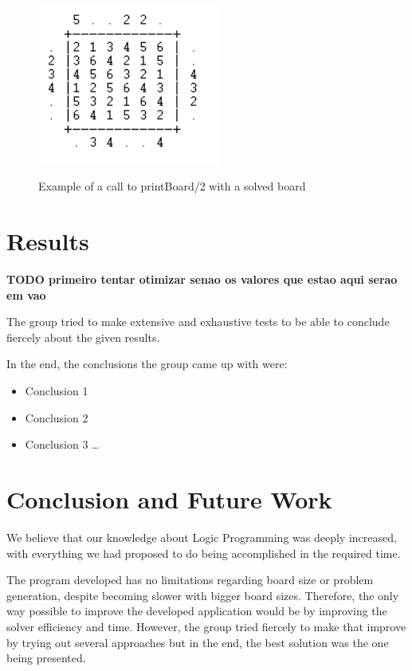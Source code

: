 \documentclass{llncs}
\begin{document}
\begin{figure}[h!]
\begin{center}
\includegraphics[height=6cm,width=6cm]{images/printBoard21.png}
\caption{Example of a call to printBoard/2 with a solved board}
\label{Figure 3}
\end{center}
\end{figure}

%
\section{Results}

\textbf{TODO primeiro tentar otimizar senao os valores que estao aqui serao em vao}

The group tried to make extensive and exhaustive tests to be able to conclude fiercely about the given results.

In the end, the conclusions the group came up with were:
\begin{itemize}
	\item Conclusion 1
	\item Conclusion 2
	\item Conclusion 3 \dots
\end{itemize}

%
\section{Conclusion and Future Work}

We believe that our knowledge about Logic Programming was deeply increased, with everything we had proposed to do being accomplished in the required time.

The program developed has no limitations regarding board size or problem generation, despite becoming slower with bigger board sizes. Therefore, the only way possible to improve the developed application would be by improving the solver efficiency and time. However, the group tried fiercely to make that improve by trying out several approaches but in the end, the best solution was the one being presented.
\end{document}
